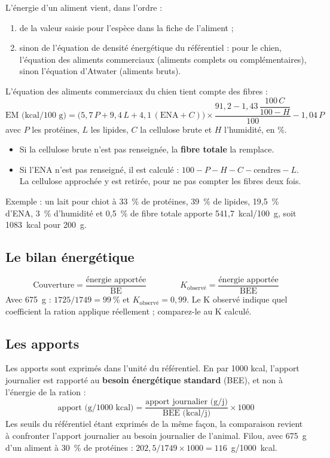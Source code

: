 \documentclass[11pt,a4paper]{article}
\begin{document}
L'énergie d'un aliment vient, dans l'ordre :
\begin{enumerate}
  \item de la valeur saisie pour l'espèce dans la fiche de l'aliment ;
  \item sinon de l'équation de densité énergétique du référentiel : pour le chien,
        l'équation des aliments commerciaux (aliments complets ou complémentaires), sinon
        l'équation d'Atwater (aliments bruts).
\end{enumerate}
L'équation des aliments commerciaux du chien tient compte des fibres :
\[
  \text{EM (kcal/100 g)} = \bigl(5{,}7\,P + 9{,}4\,L + 4{,}1\,(\text{ENA} + C)\bigr)
  \times \frac{91{,}2 - 1{,}43\,\dfrac{100\,C}{100 - H}}{100} - 1{,}04\,P
\]
avec $P$ les protéines, $L$ les lipides, $C$ la cellulose brute et $H$ l'humidité, en \%.
\begin{itemize}
  \item Si la cellulose brute n'est pas renseignée, la \textbf{fibre totale} la remplace.
  \item Si l'ENA n'est pas renseigné, il est calculé : $100 - P - H - C - \text{cendres} - L$.
        La cellulose approchée y est retirée, pour ne pas compter les fibres deux fois.
\end{itemize}
Exemple : un lait pour chiot à 33~\% de protéines, 39~\% de lipides, 19,5~\% d'ENA, 3~\%
d'humidité et 0,5~\% de fibre totale apporte 541,7~kcal/100~g, soit 1083~kcal pour 200~g.

\subsection{Le bilan énergétique}

\[
  \text{Couverture} = \frac{\text{énergie apportée}}{\text{BE}}
  \qquad\qquad
  K_{\text{observé}} = \frac{\text{énergie apportée}}{\text{BEE}}
\]
Avec 675~g : $1725 / 1749 = 99~\%$ et $K_{\text{observé}} = 0{,}99$. Le K observé indique quel
coefficient la ration applique réellement ; comparez-le au K calculé.

\subsection{Les apports}

Les apports sont exprimés dans l'unité du référentiel. En \og par 1000 kcal\fg, l'apport
journalier est rapporté au \textbf{besoin énergétique standard} (BEE), et non à l'énergie de la
ration :
\[
  \text{apport (g/1000 kcal)} = \frac{\text{apport journalier (g/j)}}{\text{BEE (kcal/j)}} \times 1000
\]
Les seuils du référentiel étant exprimés de la même façon, la comparaison revient à confronter
l'apport journalier au besoin journalier de l'animal.
Filou, avec 675~g d'un aliment à 30~\% de protéines : $202{,}5 / 1749 \times 1000 = 116$~g/1000~kcal.
\end{document}
